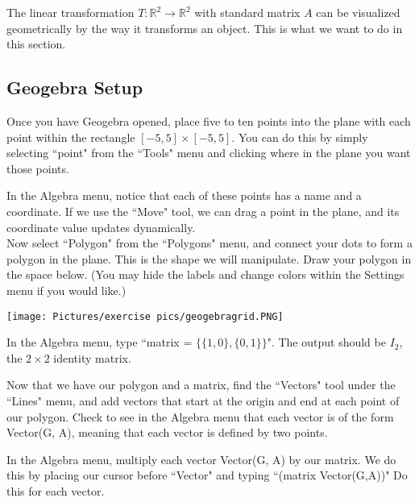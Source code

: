 \noindent The linear transformation $T: \mathbb{R}^2 \rightarrow \mathbb{R}^2$ with standard matrix $A$ can be visualized geometrically by the way it transforms an object. This is what we want to do in this section.

\subsection{Geogebra Setup}

\begin{exercise}
Once you have Geogebra opened, place five to ten points into the plane with each point within the rectangle $[-5,5] \times [-5,5]$. You can do this by simply selecting ``point" from the ``Tools" menu and clicking where in the plane you want those points.
\end{exercise}

\noindent In the Algebra menu, notice that each of these points has a name and a coordinate. If we use the ``Move" tool, we can drag a point in the plane, and its coordinate value updates dynamically. \\

\noindent Now select ``Polygon" from the ``Polygons" menu, and connect your dots to form a polygon in the plane. This is the shape we will manipulate. Draw your polygon in the space below. (You may hide the labels and change colors within the Settings menu if you would like.)

\begin{center}
\texttt{[image: Pictures/exercise pics/geogebragrid.PNG]}
\end{center}

\begin{exercise}
In the Algebra menu, type ``matrix = $\{ \{ 1, 0 \}, \{ 0, 1 \} \}$". The output should be $I_2$, the $2 \times 2$ identity matrix.
\end{exercise}

\begin{exercise}
Now that we have our polygon and a matrix, find the ``Vectors" tool under the ``Lines" menu, and add vectors that start at the origin and end at each point of our polygon. Check to see in the Algebra menu that each vector is of the form Vector(G, A), meaning that each vector is defined by two points.
\end{exercise}

\begin{exercise}
In the Algebra menu, multiply each vector Vector(G, A) by our matrix. We do this by placing our cursor before ``Vector" and typing ``(matrix Vector(G,A))" Do this for each vector.
\end{exercise}

